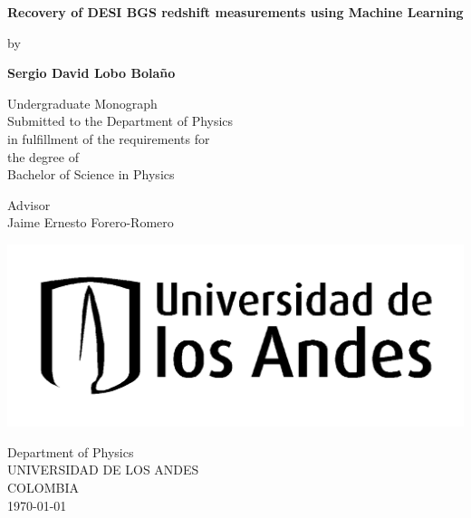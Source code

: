 \begin{titlepage}
    \begin{center}
        \vspace*{0.8 cm}
        
        \LARGE
        \textbf{Recovery of DESI BGS redshift measurements using Machine Learning}
        
       by\\
        \large
        
        
        \vspace{1.0cm}
        
        \textbf{Sergio David Lobo Bolaño}
        
        \vspace{1.1 cm}
        \large
        Undergraduate Monograph \\
                \vspace{1cm}
        \normalsize 
        Submitted to the Department of Physics\\
         in fulfillment of the requirements for\\
       the degree of\\
       \vspace{0.4 cm}
       \LARGE
       Bachelor of Science in Physics\\
      
        \vspace{2cm}
        
        \normalsize
        Advisor\\
        \Large
        Jaime Ernesto Forero-Romero
        
        
        \vspace{1cm}
\begin{center}
\includegraphics[width=0.4\linewidth]{TeX_files/universidaddelosandes}
\end{center}

                \vspace{2cm}
        \normalsize
        Department of Physics	\\
        UNIVERSIDAD DE LOS ANDES\\
        COLOMBIA\\
        \today
        
    \end{center}
\end{titlepage}